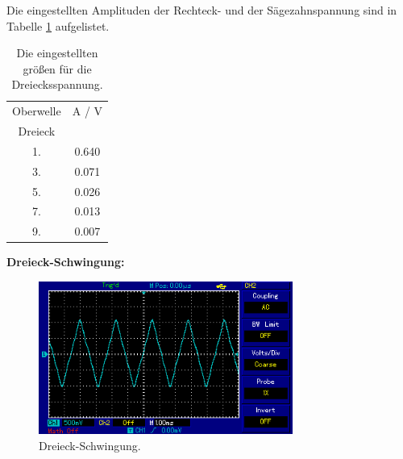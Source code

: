 Die eingestellten Amplituden der Rechteck- und der Sägezahnspannung sind in Tabelle \ref{tab:Dreis} aufgelistet.

\begin{table}[H]
  \centering
  \begin{tabular}{c c}
    \toprule
    Oberwelle & A / V \\
    Dreieck & \\
    \midrule
    1. & 0.640 \\
    3. & 0.071 \\
    5. & 0.026 \\
    7. & 0.013 \\
    9. & 0.007 \\
    \bottomrule
  \end{tabular}
  \caption{Die eingestellten größen für die Dreiecksspannung.}
  \label{tab:Dreis}
\end{table}

\textbf{Dreieck-Schwingung:} \\
\begin{figure}[H]
  \centering
  \includegraphics[height=5cm]{picture/Dreieck.PNG}
  \caption{Dreieck-Schwingung.}
  \label{fig:Drei}
\end{figure}
